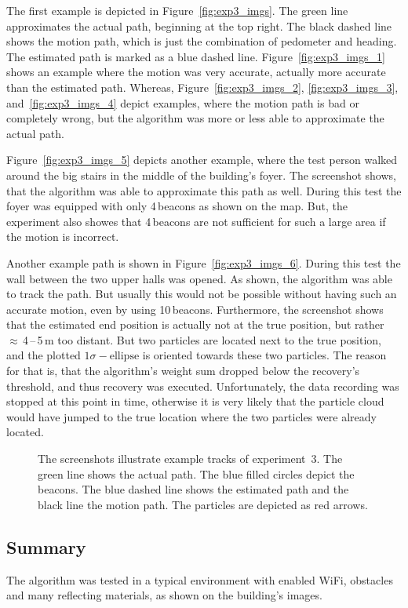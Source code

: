 The first example is depicted in Figure~\ref{fig:exp3_imgs}. The green line approximates the actual path, beginning at the top right. The black dashed line shows the motion path, which is just the combination of pedometer and heading. The estimated path is marked as a blue dashed line. Figure~\ref{fig:exp3_imgs_1} shows an example where the motion was very accurate, actually more accurate than the estimated path. Whereas, Figure~\ref{fig:exp3_imgs_2}, \ref{fig:exp3_imgs_3}, and~\ref{fig:exp3_imgs_4} depict examples, where the motion path is bad or completely wrong, but the algorithm was more or less able to approximate the actual path.

Figure~\ref{fig:exp3_imgs_5} depicts another example, where the test person walked around the big stairs in the middle of the building's foyer. The screenshot shows, that the algorithm was able to approximate this path as well. During this test the foyer was equipped with only 4\,beacons as shown on the map. But, the experiment also showes that 4\,beacons are not sufficient for such a large area if the motion is incorrect.

Another example path is shown in Figure~\ref{fig:exp3_imgs_6}. During this test the wall between the two upper halls was opened. As shown, the algorithm was able to track the path. But usually this would not be possible without having such an accurate motion, even by using 10\,beacons. Furthermore, the screenshot shows that the estimated end position is actually not at the true position, but rather $\approx$\,4\,--\,5\,m too distant. But two particles are located next to the true position, and the plotted $1\sigma-\text{ellipse}$ is oriented towards these two particles. The reason for that is, that the algorithm's weight sum dropped below the recovery's threshold, and thus recovery was executed. Unfortunately, the data recording was stopped at this point in time, otherwise it is very likely that the particle cloud would have jumped to the true location where the two particles were already located. 

\begin{figure}
	
	\caption{The screenshots illustrate example tracks of experiment~3. The green line shows the actual path. The blue filled circles depict the beacons. The blue dashed line shows the estimated path and the black line the motion path. The particles are depicted as red arrows.}
\end{figure}

\subsection*{Summary}
The algorithm was tested in a typical environment with enabled WiFi, obstacles and many reflecting materials, as shown on the building's images.

